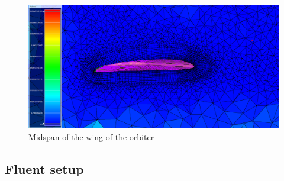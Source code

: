 \begin{figure}[H]
 \centering
 \includegraphics[width=\textwidth]{report_images/ss_wing_midspan_final.png}
 \caption{Midspan of the wing of the orbiter}
 \label{fig: ss_wing_LE}
\end{figure}


\subsection{Fluent setup}

%
%
%
%



